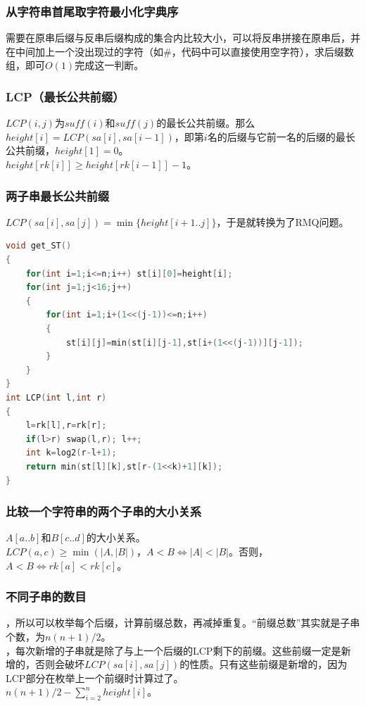 \documentclass[a4paper]{book}
\begin{document}
\subsubsection{从字符串首尾取字符最小化字典序}
需要在原串后缀与反串后缀构成的集合内比较大小，可以将反串拼接在原串后，并在中间加上一个没出现过的字符（如\#，代码中可以直接使用空字符），求后缀数组，即可$O(1)$完成这一判断。
\subsubsection{LCP（最长公共前缀）}
$LCP(i,j)$为$suff(i)$和$suff(j)$的最长公共前缀。那么$height[i]=LCP(sa[i],sa[i-1])$，即第$i$名的后缀与它前一名的后缀的最长公共前缀，$height[1]=0$。\\
\indent$height[rk[i]]\ge height[rk[i-1]]-1$。
\subsubsection{两子串最长公共前缀}
$LCP(sa[i],sa[j])=\min\{height[i+1..j]\}$，于是就转换为了RMQ问题。
\begin{lstlisting}[language=c++]
void get_ST()
{
    for(int i=1;i<=n;i++) st[i][0]=height[i];
    for(int j=1;j<16;j++)
    {
        for(int i=1;i+(1<<(j-1))<=n;i++)
        {
            st[i][j]=min(st[i][j-1],st[i+(1<<(j-1))][j-1]);
        }
    }
}
int LCP(int l,int r)
{
    l=rk[l],r=rk[r];
    if(l>r) swap(l,r); l++;
    int k=log2(r-l+1);
    return min(st[l][k],st[r-(1<<k)+1][k]);
}
\end{lstlisting}
\subsubsection{比较一个字符串的两个子串的大小关系}
$A[a..b]$和$B[c..d]$的大小关系。\\
$LCP(a,c)\ge \min(|A,|B|)$，$A<B \iff |A|<|B|$。否则，$A<B \iff rk[a]<rk[c]$。
\subsubsection{不同子串的数目}
，所以可以枚举每个后缀，计算前缀总数，再减掉重复。“前缀总数”其实就是子串个数，为$n(n+1)/2$。\\
，每次新增的子串就是除了与上一个后缀的LCP剩下的前缀。这些前缀一定是新增的，否则会破坏$LCP(sa[i],sa[j])$的性质。只有这些前缀是新增的，因为LCP部分在枚举上一个前缀时计算过了。\\
$n(n+1)/2-\displaystyle\sum_{i=2}^{n}height[i]$。
\end{document}
